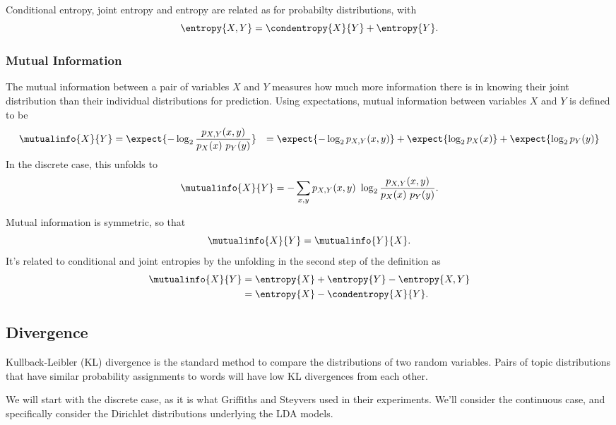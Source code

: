 Conditional entropy, joint entropy and entropy are related as for
probabilty distributions, with
%
\begin{equation}
\entropy{X,Y} = \condentropy{X}{Y} + \entropy{Y}.
\end{equation}


\subsubsection{Mutual Information}\label{section:stats-mutual-information}

The mutual information between a pair of variables $X$ and $Y$ measures how
much more information there is in knowing their joint distribution than their
individual distributions for prediction.  Using expectations, mutual information
between variables $X$ and $Y$ is defined to be
%
\begin{align}
\mutualinfo{X}{Y} 
&= \expect{-\log_2 \frac{p_{X,Y}(x,y)}{p_X(x) \ p_Y(y)}}
&= \expect{-\log_2 p_{X,Y}(x,y)} + \expect{\log_2 p_X(x)} + \expect{\log_2 p_Y(y)}
\end{align}
%
In the discrete case, this unfolds to
%
\begin{equation}
\mutualinfo{X}{Y} = - \sum_{x,y} p_{X,Y}(x,y) \ \log_2 \frac{p_{X,Y}(x,y)}{p_X(x) \ p_Y(y)}.
\end{equation}
%

Mutual information is symmetric, so that
%
\begin{equation}
\mutualinfo{X}{Y} = \mutualinfo{Y}{X}.
\end{equation}
%
It's related to conditional and joint entropies by the unfolding
in the second step of the definition as 
%
\begin{align}
\mutualinfo{X}{Y} &= \entropy{X} + \entropy{Y} - \entropy{X,Y}
\\
&= \entropy{X} - \condentropy{X}{Y}.
\end{align}
%


\subsection{Divergence}\label{section:stats-divergence}

Kullback-Leibler (KL) divergence is the standard method to compare the
distributions of two random variables.  Pairs of topic distributions
that have similar probability assignments to words will have low KL
divergences from each other.

We will start with the discrete case, as it is what Griffiths and
Steyvers used in their experiments.  We'll consider the continuous
case, and specifically consider the Dirichlet distributions underlying
the LDA models.

